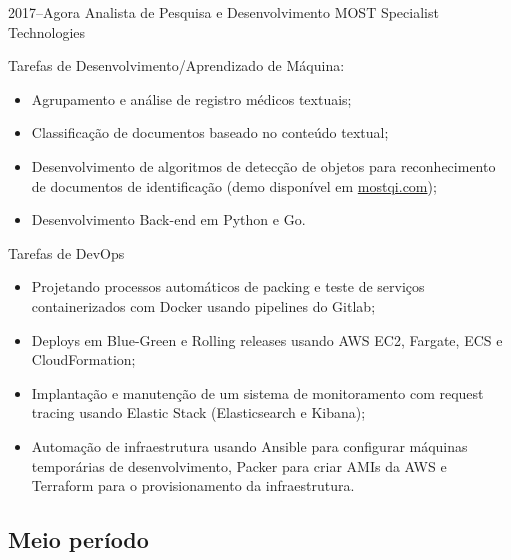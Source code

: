 \documentclass[a4paper]{cv-friggeri-x}
\begin{document}
\begin{entrylist}


\entry
    {2017--Agora}
    {Analista de Pesquisa e Desenvolvimento}
    {MOST Specialist Technologies}
    {Tarefas de Desenvolvimento/Aprendizado de Máquina:
    \begin{itemize}
        \item Agrupamento e análise de registro médicos textuais;
        \item Classificação de documentos baseado no conteúdo textual;
        \item Desenvolvimento de algoritmos de detecção de objetos para reconhecimento de documentos de identificação (demo disponível em \href{mostqi.com}{mostqi.com});
        \item Desenvolvimento Back-end em Python e Go.
    \end{itemize}
    Tarefas de DevOps
    \begin{itemize}
        \item Projetando processos automáticos de packing e teste de serviços containerizados com Docker usando pipelines do Gitlab;
        \item Deploys em Blue-Green e Rolling releases usando AWS EC2, Fargate, ECS e CloudFormation;
        \item Implantação e manutenção de um sistema de monitoramento com request tracing usando Elastic Stack (Elasticsearch e Kibana);
        \item Automação de infraestrutura usando Ansible para configurar máquinas temporárias de desenvolvimento, Packer para criar AMIs da AWS e Terraform para o provisionamento da infraestrutura.
    \end{itemize}}


\end{entrylist}


\subsection{Meio período}
\end{document}
